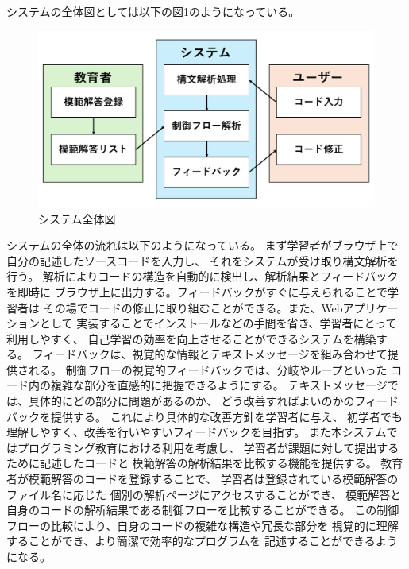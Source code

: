 \documentclass{cssspaper}
\begin{document}
        システムの全体図としては以下の図\ref{fig:system}のようになっている。

        \begin{figure}[h]
            \centering
            \includegraphics[width=13cm]{system.png}
            \caption{システム全体図}
            \label{fig:system}
        \end{figure}

        システムの全体の流れは以下のようになっている。
        まず学習者がブラウザ上で自分の記述したソースコードを入力し、
        それをシステムが受け取り構文解析を行う。
        解析によりコードの構造を自動的に検出し、解析結果とフィードバックを即時に
        ブラウザ上に出力する。フィードバックがすぐに与えられることで学習者は
        その場でコードの修正に取り組むことができる。また、Webアプリケーションとして
        実装することでインストールなどの手間を省き、学習者にとって利用しやすく、
        自己学習の効率を向上させることができるシステムを構築する。
        フィードバックは、視覚的な情報とテキストメッセージを組み合わせて提供される。
        制御フローの視覚的フィードバックでは、分岐やループといった
        コード内の複雑な部分を直感的に把握できるようにする。
        テキストメッセージでは、具体的にどの部分に問題があるのか、
        どう改善すればよいのかのフィードバックを提供する。
        これにより具体的な改善方針を学習者に与え、
        初学者でも理解しやすく、改善を行いやすいフィードバックを目指す。
        また本システムではプログラミング教育における利用を考慮し、
        学習者が課題に対して提出するために記述したコードと
        模範解答の解析結果を比較する機能を提供する。
        教育者が模範解答のコードを登録することで、
        学習者は登録されている模範解答のファイル名に応じた
        個別の解析ページにアクセスすることができ、
        模範解答と自身のコードの解析結果である制御フローを比較することができる。
        この制御フローの比較により、自身のコードの複雑な構造や冗長な部分を
        視覚的に理解することができ、より簡潔で効率的なプログラムを
        記述することができるようになる。
\end{document}
